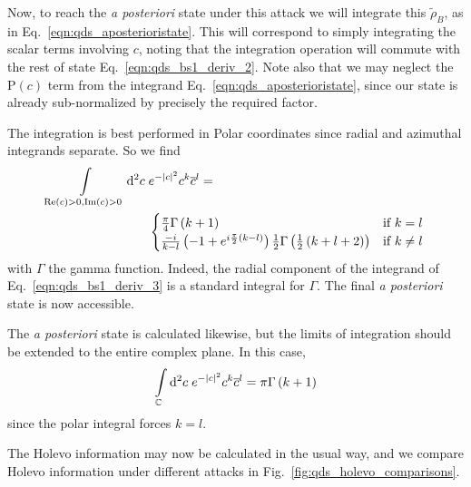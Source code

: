  Now, to reach the \emph{a posteriori} state under this attack we will integrate this $\tilde{\rho}_B$, as in Eq.~\ref{eqn:qds_aposterioristate}. This will correspond to simply integrating the scalar terms involving $c$, noting that the integration operation will commute with the rest of state Eq.~\ref{eqn:qds_bs1_deriv_2}. Note also that we may neglect the $\text{P}\left(c\right)$ term from the integrand Eq.~\ref{eqn:qds_aposterioristate}, since our state is already sub-normalized by precisely the required factor. 

The integration is best performed in Polar coordinates since radial and azimuthal integrands separate. So we find
\begin{align}\label{eqn:qds_bs1_deriv_3}
\int\limits_{\text{Re}\left(c\right)>0, \text{Im}\left(c\right)>0} \mathop{}\!\mathrm{d^2} c \; &e^{-\left|c\right|^2} c^k \overline{c}^l = \notag \\
&\begin{cases}
\frac{\pi}{4} \Gamma\left(k+1\right) & \text{if } k = l \\
\frac{-i}{k-l}\left(-1 + e^{i \frac{\pi}{2}\left(k-l\right)}\right)\frac{1}{2}\Gamma\left(\frac{1}{2}\left(k + l + 2\right) \right) & \text{if } k \ne l
\end{cases}
\end{align}
with $\Gamma$ the gamma function. Indeed, the radial component of the integrand of Eq.~\ref{eqn:qds_bs1_deriv_3} is a standard integral for $\Gamma$. The final \emph{a posteriori} state is now accessible. 

The \emph{a posteriori} state is calculated likewise, but the limits of integration should be extended to the entire complex plane. In this case,
\begin{equation}\label{eqn:qds_bs1_deriv_4}
\int\limits_{\mathbb{C}} \mathop{}\!\mathrm{d^2} c \; e^{-\left|c\right|^2}c^k \overline{c}^l = \pi \Gamma\left(k+1\right)
\end{equation}
since the polar integral forces $k=l$.




The Holevo information may now be calculated in the usual way, and we compare Holevo information under different attacks in Fig.~\ref{fig:qds_holevo_comparisons}.


